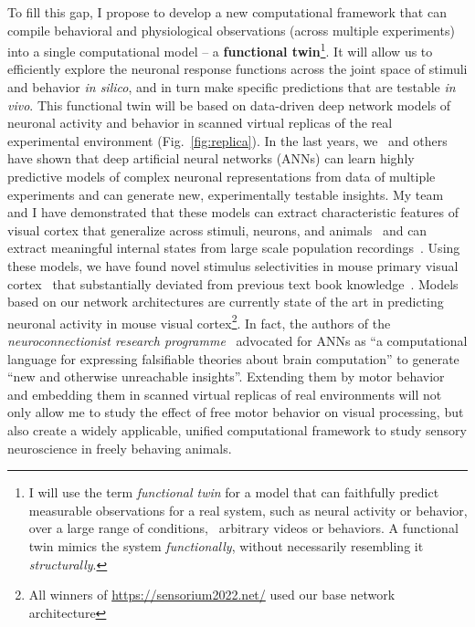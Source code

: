 \documentclass[COG,11pt]{ercgrant}
\begin{document}
To fill this gap, I propose to develop a new computational framework that can compile behavioral and physiological observations (across multiple experiments) into a single computational model -- a \textbf{functional twin}\footnote{I will use the term \textit{functional twin} for a model that can faithfully predict measurable observations for a real system, such as neural activity or behavior, over a large range of conditions, \eg~arbitrary videos or behaviors. A functional twin mimics the system \textit{functionally}, without necessarily resembling it \textit{structurally}. }. It will allow us to efficiently explore the neuronal response functions across the joint space of stimuli and behavior \textit{in silico}, and in turn make specific predictions that are testable \textit{in vivo}.
This functional twin will be based on data-driven deep network models of neuronal activity and behavior in scanned virtual replicas of the real experimental environment (Fig.~\ref{fig:replica}).
In the last years, we~\parencite{Walker2019-yw, Cobos2022-rr, Franke2022-do} and others~\parencite{Bashivan2019-ry, Ponce2019-yn, Hofling2022-wr} have shown that deep artificial neural networks (ANNs) can learn highly predictive models of complex neuronal representations from data of multiple experiments and can generate new, experimentally testable insights.
My team and I have demonstrated that these models can extract characteristic features of visual cortex that generalize across stimuli, neurons, and animals~\parencite{Sinz2018-sk,Lurz2020-ua,Cobos2022-rr} and can extract meaningful internal states from large scale population recordings~\parencite{Bashiri2021-or}. 
Using these models, we have found novel stimulus selectivities in  mouse primary visual cortex~\parencite{Walker2019-yw,Franke2022-do} that substantially deviated from previous text book knowledge~\parencite{Hubel1959-zs}.
Models based on our network architectures are currently state of the art in predicting neuronal activity in mouse visual cortex\footnote{All winners of  \url{https://sensorium2022.net/} used our base network architecture}. 
In fact, the authors of the \textit{neuroconnectionist research programme}~\parencite{Doerig2022-ex} advocated for ANNs as ``a computational language for expressing falsifiable theories about brain computation'' to generate ``new and otherwise unreachable insights''. 
Extending them by motor behavior and embedding them in scanned virtual replicas of real environments will not only allow me to study the effect of free motor behavior on visual processing, but also create a widely applicable, unified computational framework to study sensory neuroscience in freely behaving animals. 
\end{document}
